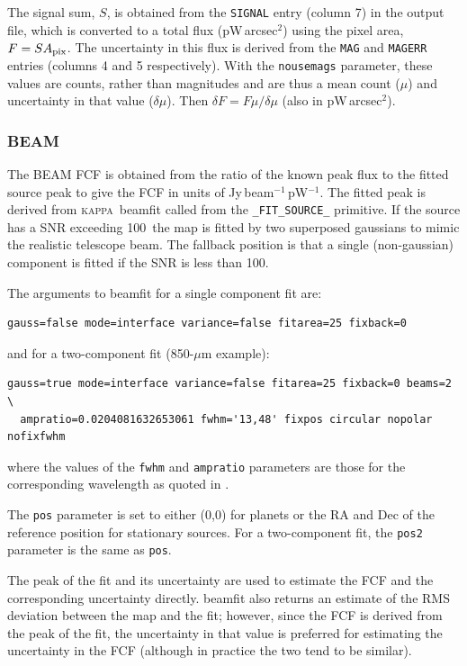 \documentclass[twoside,11pt]{article}
\renewcommand{\_}{\texttt{\symbol{95}}}
\newcommand{\KAPPA}{\textsc{kappa}}
\newcommand{\task}[1]{\textsf{#1}}
\newcommand{\snrmin}{100}
\begin{document}
The signal sum, $S$, is obtained from the \verb+SIGNAL+ entry (column
7) in the output file, which is converted to a total flux
(pW\,arcsec$^2$) using the pixel area, $F = S A_{\rm pix}$. The
uncertainty in this flux is derived from the \verb+MAG+ and
\verb+MAGERR+ entries (columns 4 and 5 respectively). With the
\verb+nousemags+ parameter, these values are counts, rather than
magnitudes and are thus a mean count ($\mu$) and uncertainty in that
value ($\delta \mu$). Then $\delta F = F \mu/\delta\mu$ (also in
pW\,arcsec$^2$).

\subsubsection{BEAM}

The BEAM FCF is obtained from the ratio of the known peak flux to the
fitted source peak to give the FCF in units of
Jy\,beam$^{-1}$\,pW$^{-1}$. The fitted peak is derived from \KAPPA\
\task{beamfit} called from the \verb+_FIT_SOURCE_+ primitive. If the
source has a SNR exceeding \snrmin\ the map is fitted by two
superposed gaussians to mimic the realistic telescope beam. The
fallback position is that a single (non-gaussian) component is fitted
if the SNR is less than \snrmin.

The arguments to \task{beamfit} for a single component fit are:
\begin{verbatim}
gauss=false mode=interface variance=false fitarea=25 fixback=0
\end{verbatim}
and for a two-component fit (850-$\mu$m example):
\begin{verbatim}
gauss=true mode=interface variance=false fitarea=25 fixback=0 beams=2 \
  ampratio=0.0204081632653061 fwhm='13,48' fixpos circular nopolar nofixfwhm
\end{verbatim}
where the values of the \verb+fwhm+ and \verb+ampratio+ parameters are
those for the corresponding wavelength as quoted in
\cite{scuba2calpaper}.

The \verb+pos+ parameter is set to either (0,0) for planets or the RA
and Dec of the reference position for stationary sources. For a
two-component fit, the \verb+pos2+ parameter is the same as
\verb+pos+.

The peak of the fit and its uncertainty are used to estimate the FCF
and the corresponding uncertainty directly. \task{beamfit} also
returns an estimate of the RMS deviation between the map and the fit;
however, since the FCF is derived from the peak of the fit, the
uncertainty in that value is preferred for estimating the uncertainty
in the FCF (although in practice the two tend to be similar).
\end{document}
